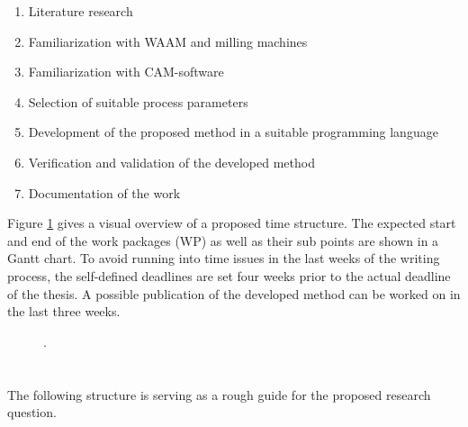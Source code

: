 \documentclass[ZLstudentexpose%
              ,optBiber%
              ,optEnglish%
              ,10pt
              ]{ZLlatex}%
\begin{document}
\begin{enumerate}
\itemsep0em 
\item Literature research
\item Familiarization with WAAM and milling machines 
\item Familiarization with CAM-software 
\item Selection of suitable process parameters
\item Development of the proposed method in a suitable programming language
\item Verification and validation of the developed method
\item Documentation of the work
\end{enumerate}
Figure \ref{TIME} gives a visual overview of a proposed time structure. The expected start and end of the work packages (WP) as well as their sub points are shown in a Gantt chart.
To avoid running into time issues in the last weeks of the writing process, the self-defined deadlines are set four weeks prior to the actual deadline of the thesis. A possible publication of the developed method can be worked on in the last three weeks.
 
\begin{figure}[H]%
    \centering%
    \ZLlangGerEng{}{}%
    \caption{.}%
    \label{TIME}
\end{figure}%

\newpage
\section{}%

{%
    \printbibliography[heading=none]%
}%
\newpage
\section{}%
The following structure is serving as a rough guide for the proposed research question.
\end{document}
